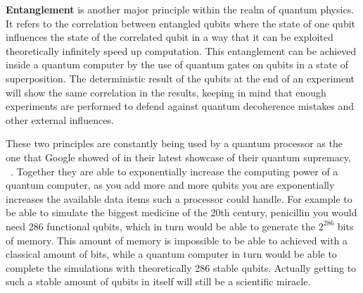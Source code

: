 \textbf{Entanglement} is another major principle within the realm of quantum physics. It refers to the correlation between entangled qubits where the state of one qubit influences the state of the correlated qubit in a way that it can be exploited theoretically infinitely speed up computation. This entanglement can be achieved inside a quantum computer by the use of quantum gates on qubits in a state of superposition. The deterministic result of the qubits at the end of an experiment will show the same correlation in the results, keeping in mind that enough experiments are performed to defend against quantum decoherence mistakes and other external influences.
~\autocite{fern2016mathematics}

These two principles are constantly being used  by a quantum processor as the one that Google showed of in their latest showcase of their quantum supremacy, ~\textcite{Google2019}. Together they are able to exponentially increase the computing power of a quantum computer, as you add more and more qubits you are exponentially increases the available data items such a processor could handle. For example to be able to simulate the biggest medicine of the 20th century, penicillin you would need 286 functional qubits, which in turn would be able to generate the $2^{286}$ bits of memory. This amount of memory is impossible to be able to achieved with a classical amount of bits, while a quantum computer in turn would be able to complete the simulations with theoretically 286 stable qubits. Actually getting to such a stable amount of qubits in itself will still be a scientific miracle. 





